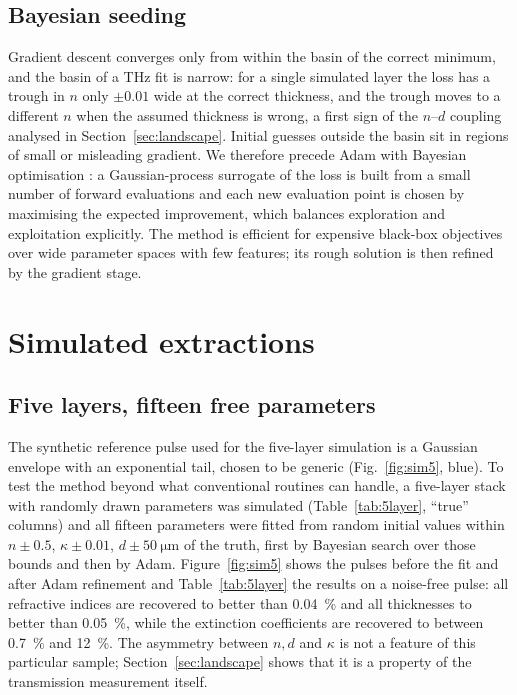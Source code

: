\documentclass{optica-article}
\newcommand{\kap}{\kappa}
\begin{document}
\subsection{Bayesian seeding}
Gradient descent converges only from within the basin of the correct minimum, and the basin of a THz fit is narrow: for a single simulated layer the loss has a trough in $n$ only $\pm0.01$ wide at the correct thickness, and the trough moves to a different $n$ when the assumed thickness is wrong, a first sign of the $n$--$d$ coupling analysed in Section~\ref{sec:landscape}. Initial guesses outside the basin sit in regions of small or misleading gradient. We therefore precede Adam with Bayesian optimisation \cite{Mockus1978,Rasmussen2006,Srinivas2010,Snoek2012,Shahriari2016,Frazier2018}: a Gaussian-process surrogate of the loss is built from a small number of forward evaluations and each new evaluation point is chosen by maximising the expected improvement, which balances exploration and exploitation explicitly. The method is efficient for expensive black-box objectives over wide parameter spaces with few features; its rough solution is then refined by the gradient stage.

\section{Simulated extractions}\label{sec:sim}
\subsection{Five layers, fifteen free parameters}
The synthetic reference pulse used for the five-layer simulation is a Gaussian envelope with an exponential tail, chosen to be generic (Fig.~\ref{fig:sim5}, blue). To test the method beyond what conventional routines can handle, a five-layer stack with randomly drawn parameters was simulated (Table~\ref{tab:5layer}, ``true'' columns) and all fifteen parameters were fitted from random initial values within $n\pm0.5$, $\kap\pm0.01$, $d\pm\SI{50}{\micro\metre}$ of the truth, first by Bayesian search over those bounds and then by Adam. Figure~\ref{fig:sim5} shows the pulses before the fit and after Adam refinement and Table~\ref{tab:5layer} the results on a noise-free pulse: all refractive indices are recovered to better than \SI{0.04}{\percent} and all thicknesses to better than \SI{0.05}{\percent}, while the extinction coefficients are recovered to between \SI{0.7}{\percent} and \SI{12}{\percent}. The asymmetry between $n,d$ and $\kap$ is not a feature of this particular sample; Section~\ref{sec:landscape} shows that it is a property of the transmission measurement itself.
\end{document}
